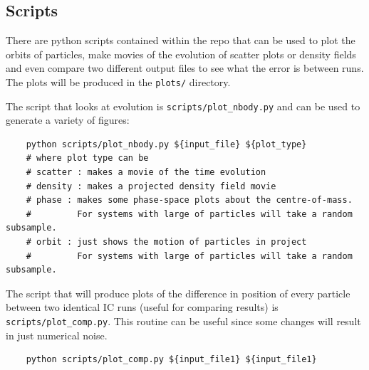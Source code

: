 \subsection{Scripts}
There are python scripts contained within the repo that can be used to plot the orbits of particles, make movies of the evolution of scatter plots or density fields and even compare two different output files to see what the error is between runs. The plots will be produced in the \texttt{plots/} directory.

\par 
The script that looks at evolution is \texttt{scripts/plot\_nbody.py} and can be used to generate a variety of figures:
\begin{center}
\begin{minipage}{0.95\textwidth}
\small
\begin{verbatim}
    python scripts/plot_nbody.py ${input_file} ${plot_type} 
    # where plot type can be 
    # scatter : makes a movie of the time evolution
    # density : makes a projected density field movie
    # phase : makes some phase-space plots about the centre-of-mass. 
    #         For systems with large of particles will take a random subsample.
    # orbit : just shows the motion of particles in project 
    #         For systems with large of particles will take a random subsample.
\end{verbatim}
\end{minipage}
\end{center}
    
\par 
The script that will produce plots of the difference in position of every particle between two identical IC runs (useful for comparing results) is \texttt{scripts/plot\_comp.py}. This routine can be useful since some changes will result in just numerical noise. 
\begin{center}
\begin{minipage}{0.95\textwidth}
\small
\begin{verbatim}
    python scripts/plot_comp.py ${input_file1} ${input_file1}  
\end{verbatim}
\end{minipage}
\end{center}

